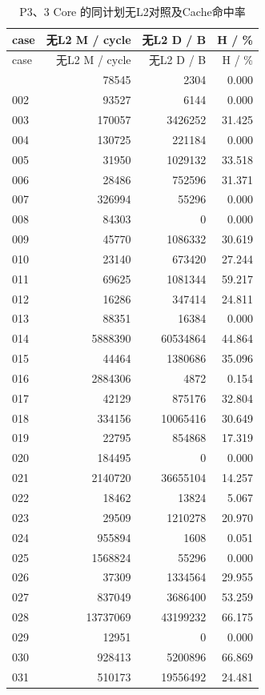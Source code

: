 \documentclass[anonymous,notoc]{gmcm2026}
\begin{document}
\begin{longtable}{lrrr}
\caption{P3、3 Core 的同计划无L2对照及Cache命中率}\\
\toprule
case & 无L2 M / cycle & 无L2 D / B & H / \%\\\midrule
\endfirsthead
\toprule
case & 无L2 M / cycle & 无L2 D / B & H / \%\\\midrule
\endhead
\bottomrule\endfoot
001 & 78545 & 2304 & 0.000 \\
002 & 93527 & 6144 & 0.000 \\
003 & 170057 & 3426252 & 31.425 \\
004 & 130725 & 221184 & 0.000 \\
005 & 31950 & 1029132 & 33.518 \\
006 & 28486 & 752596 & 31.371 \\
007 & 326994 & 55296 & 0.000 \\
008 & 84303 & 0 & 0.000 \\
009 & 45770 & 1086332 & 30.619 \\
010 & 23140 & 673420 & 27.244 \\
011 & 69625 & 1081344 & 59.217 \\
012 & 16286 & 347414 & 24.811 \\
013 & 88351 & 16384 & 0.000 \\
014 & 5888390 & 60534864 & 44.864 \\
015 & 44464 & 1380686 & 35.096 \\
016 & 2884306 & 4872 & 0.154 \\
017 & 42129 & 875176 & 32.804 \\
018 & 334156 & 10065416 & 30.649 \\
019 & 22795 & 854868 & 17.319 \\
020 & 184495 & 0 & 0.000 \\
021 & 2140720 & 36655104 & 14.257 \\
022 & 18462 & 13824 & 5.067 \\
023 & 29509 & 1210278 & 20.970 \\
024 & 955894 & 1608 & 0.051 \\
025 & 1568824 & 55296 & 0.000 \\
026 & 37309 & 1334564 & 29.955 \\
027 & 837049 & 3686400 & 53.259 \\
028 & 13737069 & 43199232 & 66.175 \\
029 & 12951 & 0 & 0.000 \\
030 & 928413 & 5200896 & 66.869 \\
031 & 510173 & 19556492 & 24.481 \\

\end{longtable}
\end{document}
